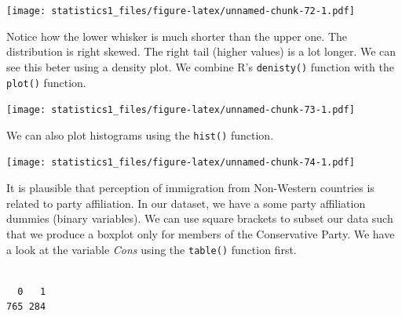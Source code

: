 \documentclass[]{article}
\newenvironment{Shaded}{\begin{snugshade}}{\end{snugshade}}
\newcommand{\KeywordTok}[1]{\textcolor[rgb]{0.13,0.29,0.53}{\textbf{#1}}}
\newcommand{\DataTypeTok}[1]{\textcolor[rgb]{0.13,0.29,0.53}{#1}}
\newcommand{\StringTok}[1]{\textcolor[rgb]{0.31,0.60,0.02}{#1}}
\newcommand{\CommentTok}[1]{\textcolor[rgb]{0.56,0.35,0.01}{\textit{#1}}}
\newcommand{\OperatorTok}[1]{\textcolor[rgb]{0.81,0.36,0.00}{\textbf{#1}}}
\newcommand{\NormalTok}[1]{#1}
\theoremstyle{definition}
\theoremstyle{definition}
\theoremstyle{definition}
\theoremstyle{remark}
\begin{document}
\texttt{[image: statistics1\_files/figure-latex/unnamed-chunk-72-1.pdf]}

Notice how the lower whisker is much shorter than the upper one. The
distribution is right skewed. The right tail (higher values) is a lot
longer. We can see this beter using a density plot. We combine R's
\texttt{denisty()} function with the \texttt{plot()} function.

\begin{Shaded}
\end{Shaded}

\texttt{[image: statistics1\_files/figure-latex/unnamed-chunk-73-1.pdf]}

We can also plot histograms using the \texttt{hist()} function.

\begin{Shaded}
\end{Shaded}

\texttt{[image: statistics1\_files/figure-latex/unnamed-chunk-74-1.pdf]}

It is plausible that perception of immigration from Non-Western
countries is related to party affiliation. In our dataset, we have a
some party affiliation dummies (binary variables). We can use square
brackets to subset our data such that we produce a boxplot only for
members of the Conservative Party. We have a look at the variable
\emph{Cons} using the \texttt{table()} function first.

\begin{Shaded}
\end{Shaded}

\begin{verbatim}

  0   1 
765 284 
\end{verbatim}
\end{document}

